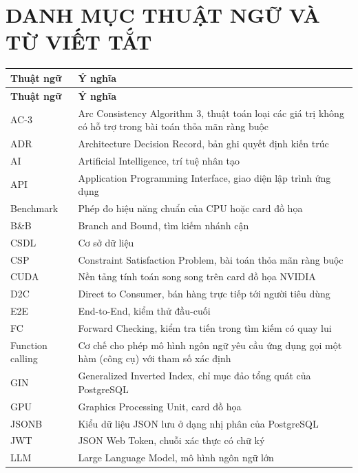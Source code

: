\chapter*{\centering DANH MỤC THUẬT NGỮ VÀ TỪ VIẾT TẮT}

\begin{center}
\small
\begin{longtable}{|L{3.4cm}|L{10.6cm}|}
\hline
\textbf{Thuật ngữ} & \textbf{Ý nghĩa} \\ \hline
\endfirsthead
\hline
\textbf{Thuật ngữ} & \textbf{Ý nghĩa} \\ \hline
\endhead
AC-3 & Arc Consistency Algorithm 3, thuật toán loại các giá trị không có hỗ trợ trong bài toán thỏa mãn ràng buộc \\ \hline
ADR & Architecture Decision Record, bản ghi quyết định kiến trúc \\ \hline
AI & Artificial Intelligence, trí tuệ nhân tạo \\ \hline
API & Application Programming Interface, giao diện lập trình ứng dụng \\ \hline
Benchmark & Phép đo hiệu năng chuẩn của CPU hoặc card đồ họa \\ \hline
B\&B & Branch and Bound, tìm kiếm nhánh cận \\ \hline
CSDL & Cơ sở dữ liệu \\ \hline
CSP & Constraint Satisfaction Problem, bài toán thỏa mãn ràng buộc \\ \hline
CUDA & Nền tảng tính toán song song trên card đồ họa NVIDIA \\ \hline
D2C & Direct to Consumer, bán hàng trực tiếp tới người tiêu dùng \\ \hline
E2E & End-to-End, kiểm thử đầu-cuối \\ \hline
FC & Forward Checking, kiểm tra tiến trong tìm kiếm có quay lui \\ \hline
Function calling & Cơ chế cho phép mô hình ngôn ngữ yêu cầu ứng dụng gọi một hàm (công cụ) với tham số xác định \\ \hline
GIN & Generalized Inverted Index, chỉ mục đảo tổng quát của PostgreSQL \\ \hline
GPU & Graphics Processing Unit, card đồ họa \\ \hline
JSONB & Kiểu dữ liệu JSON lưu ở dạng nhị phân của PostgreSQL \\ \hline
JWT & JSON Web Token, chuỗi xác thực có chữ ký \\ \hline
LLM & Large Language Model, mô hình ngôn ngữ lớn \\ \hline

\end{longtable}
\end{center}
